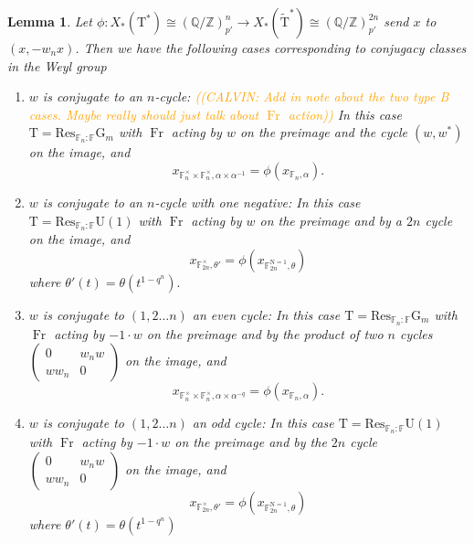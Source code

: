 \documentclass[12pt, reqno]{amsart}
\newtheorem{lemma}[theorem]{Lemma}
\theoremstyle{definition}
\theoremstyle{definition}
\theoremstyle{definition}
\newcommand{\aFieldNorm}{\mathrm{N}}
\newcommand{\finiteField}{\mathbb{F}}
\newcommand{\finiteFieldExtension}[1]{\finiteField_{#1}}
\newcommand{\NormOneGroup}[1]{\finiteFieldExtension{#1}^{\aFieldNorm = 1}}
\newcommand{\Frobenius}{\operatorname{Fr}}
\newcommand{\algebraicGroup}[1]{\boldsymbol{\mathrm{#1}}}
\newcommand{\calvin}[1]{\textcolor{orange}{\sffamily ((CALVIN: #1))}}
\begin{document}
\begin{lemma}
\label{lem:cochar_computation}
    Let $\phi:X_*(\algebraicGroup{T}^*) \cong (\mathbb{Q}/\mathbb{Z})_{p'}^n \to X_*(\tilde{\algebraicGroup{T}}^*) \cong (\mathbb{Q}/\mathbb{Z})_{p'}^{2n}$ send $x$ to $(x,-w_n x)$. Then we have the following cases corresponding to conjugacy classes in the Weyl group
    \begin{enumerate}
        \item[B,C,D Case 1)] $w$ is conjugate to an $n$-cycle: \calvin{Add in note about the two type B cases. Maybe really should just talk about $\Frobenius$ action} In this case $\algebraicGroup{T} = \mathrm{Res}_{\mathbb{F}_n:\mathbb{F}}\algebraicGroup{G}_m$ with $\Frobenius$ acting by $w$ on the preimage and the cycle $(w,w^\ast)$ on the image, and $$x_{\finiteFieldExtension{n}^\times \times \finiteFieldExtension{n}^\times,\alpha \times \alpha^{-1}} = \phi(x_{\finiteFieldExtension{n},\alpha}).$$
        \item[B,C,D Case 2)] $w$ is conjugate to an $n$-cycle with one negative:
 In this case $\algebraicGroup{T} = \mathrm{Res}_{\mathbb{F}_n:\mathbb{F}}\algebraicGroup{U}(1)$ with $\Frobenius$ acting by $w$ on the preimage and by a $2n$ cycle on the image, and $$x_{\finiteField_{2n}^\times,\theta'}=\phi(x_{\NormOneGroup{2n},\theta})$$ where $\theta'(t) = \theta(t^{1-q^n}).$
    \item[$G=\algebraicGroup{U}$ Case 1)] $w$ is conjugate to $(1,2 \hdots n)$ an even cycle: In this case $\algebraicGroup{T} = \mathrm{Res}_{\mathbb{F}_n:\mathbb{F}}\algebraicGroup{G}_m$ with $\Frobenius$ acting by $-1\cdot w$ on the preimage and by the product of two $n$ cycles $\begin{pmatrix} 0 & w_nw \\
        w w_n & 0
        \end{pmatrix}$  on the image, and 
		$$x_{\finiteFieldExtension{n}^\times \times \finiteFieldExtension{n}^\times,\alpha \times \alpha^{-q}} = \phi(x_{\finiteFieldExtension{n},\alpha}).$$
    \item[$G=\algebraicGroup{U}$ Case 2)] $w$ is conjugate to $(1,2 \hdots n)$ an odd cycle: In this case $\algebraicGroup{T} = \mathrm{Res}_{\mathbb{F}_n:\mathbb{F}}\algebraicGroup{U}(1)$ with $\Frobenius$ acting by $-1\cdot w$ on the preimage and by the $2n$ cycle $\begin{pmatrix} 0 & w_nw \\
        w w_n& 0
        \end{pmatrix}$ on the image, and $$x_{\finiteField_{2n}^\times,\theta'}=\phi(x_{\NormOneGroup{2n},\theta})$$ where $\theta'(t) = \theta(t^{1-q^n})$
    \end{enumerate}
\end{lemma}
\end{document}

